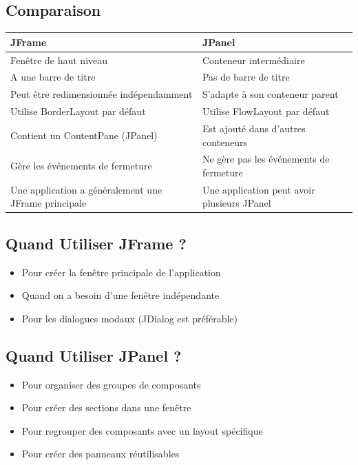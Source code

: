 \documentclass[11pt,a4paper]{article}
\begin{document}
\subsection{Comparaison}

\begin{table}[h]
\centering
\begin{tabular}{|p{6cm}|p{6cm}|}
\hline
\textbf{JFrame} & \textbf{JPanel} \\
\hline
Fenêtre de haut niveau & Conteneur intermédiaire \\
\hline
A une barre de titre & Pas de barre de titre \\
\hline
Peut être redimensionnée indépendamment & S'adapte à son conteneur parent \\
\hline
Utilise BorderLayout par défaut & Utilise FlowLayout par défaut \\
\hline
Contient un ContentPane (JPanel) & Est ajouté dans d'autres conteneurs \\
\hline
Gère les événements de fermeture & Ne gère pas les événements de fermeture \\
\hline
Une application a généralement une JFrame principale & Une application peut avoir plusieurs JPanel \\
\hline
\end{tabular}
\end{table}

\subsection{Quand Utiliser JFrame ?}

\begin{itemize}
    \item Pour créer la fenêtre principale de l'application
    \item Quand on a besoin d'une fenêtre indépendante
    \item Pour les dialogues modaux (JDialog est préférable)
\end{itemize}

\subsection{Quand Utiliser JPanel ?}

\begin{itemize}
    \item Pour organiser des groupes de composants
    \item Pour créer des sections dans une fenêtre
    \item Pour regrouper des composants avec un layout spécifique
    \item Pour créer des panneaux réutilisables
\end{itemize}
\end{document}
